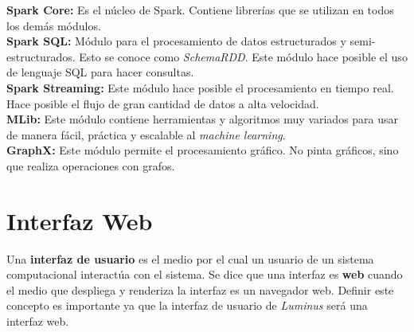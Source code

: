 \begin{UClist}
	\UCli \textbf{Spark Core:} Es el núcleo de Spark. Contiene librerías que se utilizan en todos los demás módulos.\\

	\UCli \textbf{Spark SQL:} Módulo para el procesamiento de datos estructurados y semi-estructurados. Esto se conoce como \emph{SchemaRDD}. Este módulo hace posible el uso de lenguaje SQL para hacer consultas.\\

	\UCli \textbf{Spark Streaming:} Este módulo hace posible el procesamiento en tiempo real. Hace posible el flujo de gran cantidad de datos a alta velocidad.\\

	\UCli \textbf{MLib:} Este módulo contiene herramientas y algoritmos muy variados para usar de manera fácil, práctica y escalable al \emph{machine learning}.\\

	\UCli \textbf{GraphX:} Este módulo permite el procesamiento gráfico. No pinta gráficos, sino que realiza operaciones con grafos.\\

\end{UClist}

\section{Interfaz Web}
Una \textbf{interfaz de usuario} es el medio por el cual un usuario de un sistema computacional interactúa con el sistema. Se dice que una interfaz es \textbf{web} cuando el medio que despliega y renderiza la interfaz es un navegador web. Definir este concepto es importante ya que la interfaz de usuario de \emph{Luminus} será una interfaz web.\\

